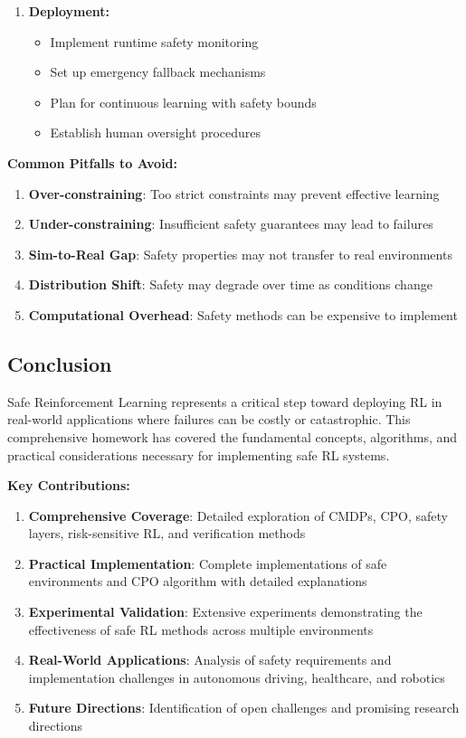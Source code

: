 \documentclass[12pt]{article}
\begin{document}
{{{{\begin{enumerate}
\item \textbf{Deployment:}
   \begin{itemize}
   \item Implement runtime safety monitoring
   \item Set up emergency fallback mechanisms
   \item Plan for continuous learning with safety bounds
   \item Establish human oversight procedures
   \end{itemize}
\end{enumerate}

\textbf{Common Pitfalls to Avoid:}
\begin{enumerate}
\item \textbf{Over-constraining}: Too strict constraints may prevent effective learning
\item \textbf{Under-constraining}: Insufficient safety guarantees may lead to failures
\item \textbf{Sim-to-Real Gap}: Safety properties may not transfer to real environments
\item \textbf{Distribution Shift}: Safety may degrade over time as conditions change
\item \textbf{Computational Overhead}: Safety methods can be expensive to implement
\end{enumerate}

\subsection{Conclusion}

Safe Reinforcement Learning represents a critical step toward deploying RL in real-world applications where failures can be costly or catastrophic. This comprehensive homework has covered the fundamental concepts, algorithms, and practical considerations necessary for implementing safe RL systems.

\textbf{Key Contributions:}
\begin{enumerate}
\item \textbf{Comprehensive Coverage}: Detailed exploration of CMDPs, CPO, safety layers, risk-sensitive RL, and verification methods
\item \textbf{Practical Implementation}: Complete implementations of safe environments and CPO algorithm with detailed explanations
\item \textbf{Experimental Validation}: Extensive experiments demonstrating the effectiveness of safe RL methods across multiple environments
\item \textbf{Real-World Applications}: Analysis of safety requirements and implementation challenges in autonomous driving, healthcare, and robotics
\item \textbf{Future Directions}: Identification of open challenges and promising research directions
\end{enumerate}

}}}}
\end{document}
